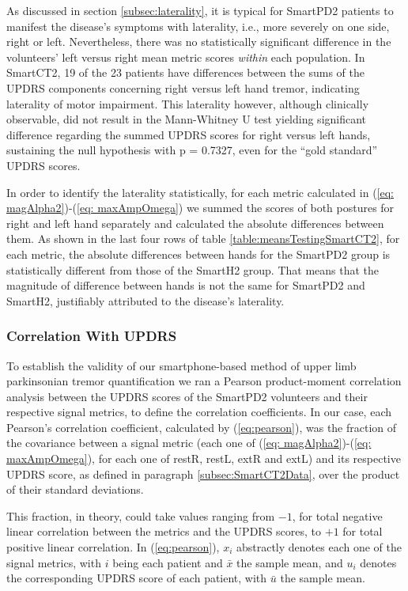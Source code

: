 As discussed in section \ref{subsec:laterality}, it is typical for \gls{SmartPD2} patients to manifest the disease's symptoms with laterality, i.e., more severely on one side, right or left. Nevertheless, there was no statistically significant difference in the volunteers' left versus right mean metric scores \textit{within} each population. In \gls{SmartCT2}, 19 of the 23 patients have differences between the sums of the \gls{UPDRS} components concerning right versus left hand tremor, indicating laterality of motor impairment. This laterality however, although clinically observable, did not result in the Mann-Whitney U test yielding significant difference regarding the summed \gls{UPDRS} scores for right versus left hands, sustaining the null hypothesis with p = 0.7327, even for the ``gold standard'' \gls{UPDRS} scores. 

In order to identify the laterality statistically, for each metric calculated in (\ref{eq: magAlpha2})-(\ref{eq: maxAmpOmega}) we summed the scores of both postures for right and left hand separately and calculated the absolute differences between them. As shown in the last four rows of table \ref{table:meansTestingSmartCT2}, for each metric, the absolute differences between hands for the \gls{SmartPD2} group is statistically different from those of the \gls{SmartH2} group. That means that the magnitude of difference between hands is not the same for \gls{SmartPD2} and \gls{SmartH2}, justifiably attributed to the disease's laterality. 

\subsubsection{Correlation With UPDRS}
\label{subsubsec:PenCTCorrelation}
To establish the validity of our smartphone-based method of upper limb parkinsonian tremor quantification we ran a Pearson product-moment correlation analysis between the \gls{UPDRS} scores of the \gls{SmartPD2} volunteers and their respective signal metrics, to define the correlation coefficients. In our case, each Pearson's correlation coefficient, calculated by (\ref{eq:pearson}), was the fraction of the covariance between a signal metric (each one of (\ref{eq: magAlpha2})-(\ref{eq: maxAmpOmega}), for each one of restR, restL, extR and extL) and its respective \gls{UPDRS} score, as defined in paragraph \ref{subsec:SmartCT2Data}, over the product of their standard deviations. 

\noindent
This fraction, in theory, could take values ranging from $-1$, for total negative linear correlation between the metrics and the \gls{UPDRS} scores, to $+1$ for total positive linear correlation. In (\ref{eq:pearson}), $x_{i}$ abstractly denotes each one of the signal metrics, with $i$ being each patient and $\bar{x}$ the sample mean, and $u_{i}$ denotes the corresponding \gls{UPDRS} score of each patient, with $\bar{u}$ the sample mean.

